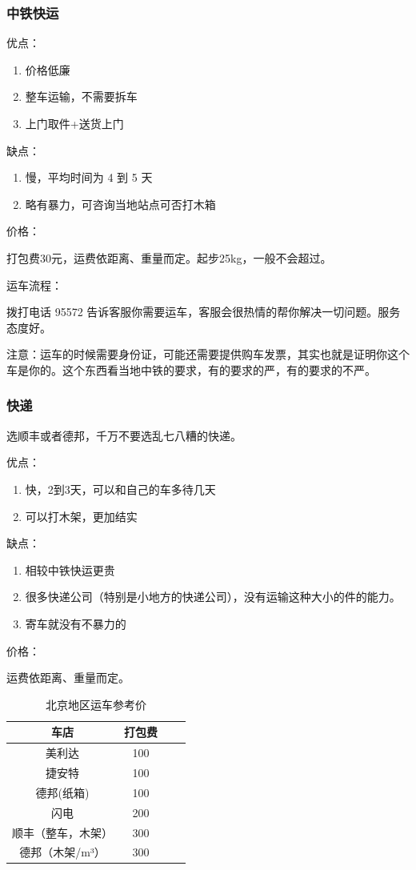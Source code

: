 \documentclass{ctexbook}
\begin{document}
\subsubsection{中铁快运}
优点：
\begin{enumerate}
    \item 价格低廉
    \item 整车运输，不需要拆车
    \item 上门取件+送货上门
\end{enumerate}

缺点：
\begin{enumerate}
    \item 慢，平均时间为 4 到 5 天
    \item 略有暴力，可咨询当地站点可否打木箱
\end{enumerate}

价格：

打包费30元，运费依距离、重量而定。起步25kg，一般不会超过。

运车流程：

拨打电话 95572 告诉客服你需要运车，客服会很热情的帮你解决一切问题。服务态度好。

注意：运车的时候需要身份证，可能还需要提供购车发票，其实也就是证明你这个车是你的。这个东西看当地中铁的要求，有的要求的严，有的要求的不严。
\subsubsection{快递}
选顺丰或者德邦，千万不要选乱七八糟的快递。

优点：
\begin{enumerate}
    \item 快，2到3天，可以和自己的车多待几天
    \item 可以打木架，更加结实
\end{enumerate}

缺点：
\begin{enumerate}
    \item 相较中铁快运更贵
    \item 很多快递公司（特别是小地方的快递公司），没有运输这种大小的件的能力。
    \item 寄车就没有不暴力的
\end{enumerate}

价格：

运费依距离、重量而定。
\begin{table}[H]
    \centering
    \begin{tabular}{|c|c|c|c|}
    \hline
        车店 & 打包费  \\ \hline
        美利达 & 100  \\ \hline
        捷安特 & 100  \\ \hline
        德邦(纸箱) & 100  \\ \hline
        闪电 & 200  \\ \hline
        顺丰（整车，木架） &  300  \\ \hline
        德邦（木架/m³）  &  300  \\ \hline
    \end{tabular}
    \caption{北京地区运车参考价}
\end{table}
\end{document}
